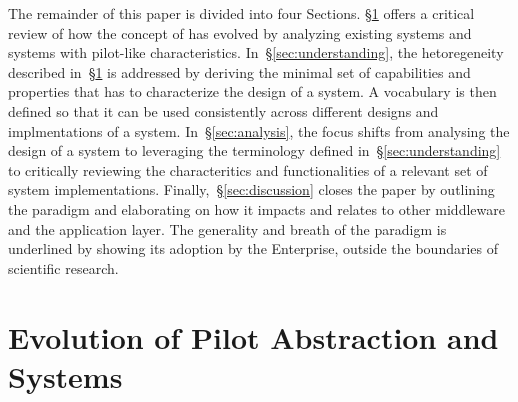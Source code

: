 \documentclass{sig-alternate}
\begin{document}

The remainder of this paper is divided into four Sections. \S\ref{sec:history}
offers a critical review of how the concept of \pilotjobs has evolved by
analyzing existing \pilot systems and systems with pilot-like characteristics.
In~\S\ref{sec:understanding}, the hetoregeneity described
in~\S\ref{sec:history} is addressed by deriving the minimal set of capabilities
and properties that has to characterize the design of a \pilot system. A
vocabulary is then defined so that it can be used consistently across different
designs and implmentations of a \pilot system. In~\S\ref{sec:analysis}, the
focus shifts from analysing the design of a \pilot system to  leveraging the
terminology defined in~\S\ref{sec:understanding} to critically reviewing the
characteritics and functionalities of a relevant set of \pilot system
implementations. Finally,~\S\ref{sec:discussion} closes the paper by outlining
the \pilot paradigm and elaborating on how it impacts and relates to other
middleware and the application layer. The generality and breath of the \pilot
paradigm is underlined by showing its adoption by the Enterprise, outside the
boundaries of scientific research.


%
\section{Evolution of Pilot Abstraction and Systems}
\label{sec:history}



\end{document}
